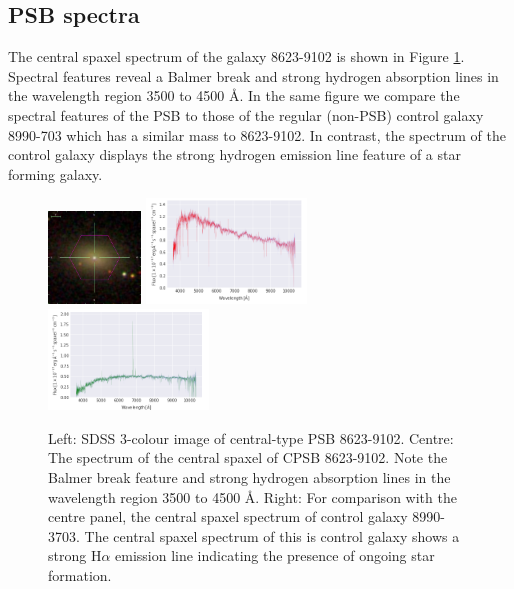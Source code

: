 \subsection{PSB spectra}
The central spaxel spectrum of the galaxy 8623-9102 is shown in Figure \ref{fig:CPSB-8623-9102-spec}. Spectral features reveal a Balmer break and strong hydrogen absorption lines in the wavelength region 3500 to 4500 \AA. In the same figure we compare the spectral features of the PSB to those of the regular (non-PSB) control galaxy 8990-703 which has a similar mass to 8623-9102. In contrast, the spectrum of the control galaxy displays the strong hydrogen emission line feature of a star forming galaxy.

\begin{figure}
    \centering
    \includegraphics[width=0.22\textwidth]{images/Cutouts/CPSB-8623-9102-IM.png}
    \hfill
    \includegraphics[width=0.38\textwidth]{images/Spectra/CPSB-8623-9102.png}
    \hfill
    \includegraphics[width=0.38\textwidth]{images/Spectra/CPSB-CTRL-8990-3703-spec.png}
    \caption[Central spaxel spectrum of CPSB 8623-9102]{Left: SDSS 3-colour image of central-type PSB 8623-9102. 
    Centre: The spectrum of the central spaxel of CPSB  8623-9102. Note the Balmer break feature and strong hydrogen absorption lines in the wavelength region 3500 to 4500 \AA.
    Right: For comparison with the centre panel, the central spaxel spectrum of control galaxy 8990-3703. The central spaxel spectrum of this is control galaxy shows a strong H$\alpha$ emission line indicating the presence of ongoing star formation.}
    \label{fig:CPSB-8623-9102-spec}
\end{figure}


